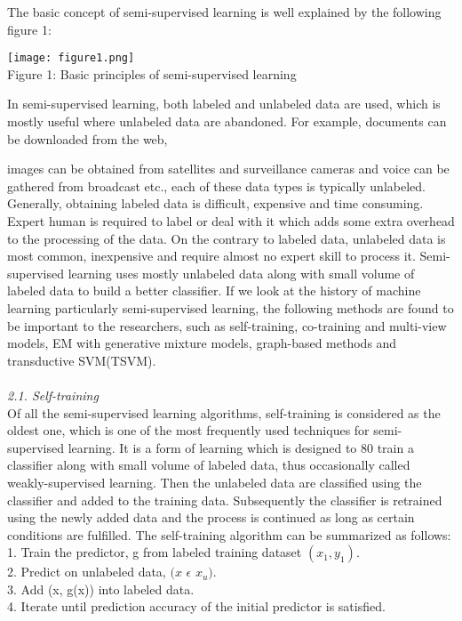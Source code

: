 \documentclass{article}
\begin{document}
	The basic concept of semi-supervised learning is well explained by the following figure 1:
	
	
	\begin{center}
		\texttt{[image: figure1.png]}\\
		\small Figure 1: Basic principles of semi-supervised learning
		\vspace{1em}
		\normalsize
		
		
		\end {center}
		\hspace{0.3cm} In semi-supervised learning, both labeled and unlabeled data are used, which is mostly useful where unlabeled data are abandoned. For example, documents can be downloaded from the web,
		
		
		\newpage images can be obtained from satellites and surveillance cameras and voice can be gathered from broadcast etc., each of
		these data types is typically unlabeled. Generally, obtaining labeled data is difficult, expensive and time consuming. Expert human is required to label or deal with it which adds some extra overhead to the
		processing of the data. On the contrary to labeled data, unlabeled data is most common, inexpensive and
		require almost no expert skill to process it. Semi-supervised learning uses mostly unlabeled data along
		with small volume of labeled data to build a better classifier. If we look at the history of machine learning
		particularly semi-supervised learning, the following methods are found to be important to the researchers, such as self-training, co-training and multi-view models, EM with generative mixture models, graph-based
		methods and transductive SVM(TSVM).\\\\[10pt]
		\textit{2.1. Self-training}\\

		Of all the semi-supervised learning algorithms, self-training is considered as the oldest one, which is one of
		the most frequently used techniques for semi-supervised learning. It is a form of learning which is designed to
		80 train a classifier along with small volume of labeled data, thus occasionally called weakly-supervised learning.
		Then the unlabeled data are classified using the classifier and added to the training data. Subsequently the
		classifier is retrained using the newly added data and the process is continued as long as certain conditions
		are fulfilled. The self-training algorithm can be summarized as follows:\\[8pt]
		1. Train the predictor, g from labeled training dataset $(x_1, y_1)$.\\
		2. Predict on unlabeled data, $(x$ $\epsilon$ $x_u)$.\\
		3. Add (x, g(x)) into labeled data.\\
		4. Iterate until prediction accuracy of the initial predictor is satisfied.\\
		
\end{document}

